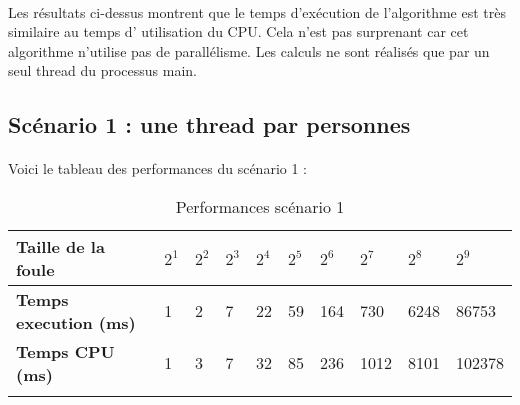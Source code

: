 \documentclass[12pt,oneside,a4paper]{article}
\begin{document}
\paragraph{}
Les résultats ci-dessus montrent que le temps d'exécution de l'algorithme est très similaire au temps d'
utilisation du CPU. Cela n'est pas surprenant car cet algorithme n'utilise pas de parallélisme. Les 
calculs ne sont réalisés que par un seul thread du processus main.

\subsection{Scénario 1 : une thread par personnes}
\paragraph{}
Voici le tableau des performances du scénario 1 :

\begin{table}[h]
  \centering
  \small
  \begin{tabular}{llllllllll}
    \hline
    \multicolumn{1}{|l|}{\textbf{Taille de la foule}}                     & \multicolumn{1}{l|}{$2^1$} & \multicolumn{1}{l|}{$2^2$} & \multicolumn{1}{l|}{$2^3$} & \multicolumn{1}{l|}{$2^4$} & \multicolumn{1}{l|}{$2^5$} & \multicolumn{1}{l|}{$2^6$} & \multicolumn{1}{l|}{$2^7$} & \multicolumn{1}{l|}{$2^8$} & \multicolumn{1}{l|}{$2^9$} \\ \hline
    \multicolumn{1}{|l|}{\textbf{Temps execution (ms)}} & \multicolumn{1}{l|}{1}  & \multicolumn{1}{l|}{2}  & \multicolumn{1}{l|}{7}  & \multicolumn{1}{l|}{22}  & \multicolumn{1}{l|}{59}  & \multicolumn{1}{l|}{164}  & \multicolumn{1}{l|}{730}  & \multicolumn{1}{l|}{6248}  & \multicolumn{1}{l|}{86753}  \\ \hline
    \multicolumn{1}{|l|}{\textbf{Temps CPU (ms)}}    & \multicolumn{1}{l|}{1}  & \multicolumn{1}{l|}{3}  & \multicolumn{1}{l|}{7}  & \multicolumn{1}{l|}{32}  & \multicolumn{1}{l|}{85}  & \multicolumn{1}{l|}{236}  & \multicolumn{1}{l|}{1012}  & \multicolumn{1}{l|}{8101}  & \multicolumn{1}{l|}{102378}  \\ \hline
                                                                          &                        &                        &                        &                        &                        &                        &                        &                        &                       
    \end{tabular}
  \caption{Performances scénario 1}
  \label{Performances scénario 1}
\end{table}
\end{document}

